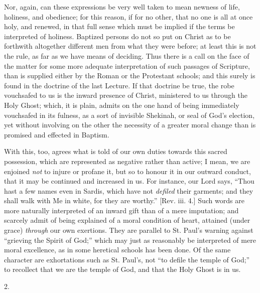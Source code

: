 Nor, again, can these expressions be very well taken to mean
newness of life, holiness, and obedience; for this reason, if for no
other, that no one is all at once holy, and renewed, in that full
sense which must be implied if the terms be interpreted of holiness.
Baptized persons do not so put on Christ as to be forthwith altogether
different men from what they were before; at least this is not the
rule, as far as we have means of deciding. Thus there is a call on the
face of the matter for some more adequate interpretation of such
passages of Scripture, than is supplied either by the Roman or the
Protestant schools; and this surely is found in the doctrine of the
last Lecture. If that doctrine be true, the robe vouchsafed to us is
the inward presence of Christ, ministered to us through the Holy
Ghost; which, it is plain, admits on the one hand of being immediately
vouchsafed in its fulness, as a sort of invisible Shekinah, or seal of
God's election, yet without involving on the other the necessity of a
greater moral change than is promised and effected in Baptism.

With this, too, agrees what is told of our own duties towards this
sacred possession, which are represented as negative rather than
active; I mean, we are enjoined \emph{not} to injure or profane it,
but so to honour it in our outward conduct, that it may be continued
and increased in us. For instance, our Lord says, ``Thou hast a
few names even in Sardis, which have not \emph{defiled} their
garments; and they shall walk with Me in white, for they are
worthy.'' [Rev. iii. 4.] Such words are more naturally interpreted
of an inward gift than of a mere imputation; and scarcely admit of
being explained of a moral condition of heart, attained (under grace) \emph{through}
our own exertions. They are parallel to St. Paul's warning against
``grieving the Spirit of God;'' which may just as reasonably
be interpreted of mere moral excellence, as in some heretical schools
has been done. Of the same character are exhortations such as St.
Paul's, not ``to defile the temple of God;'' to recollect that
we are the temple of God, and that the Holy Ghost is in us.

2.

